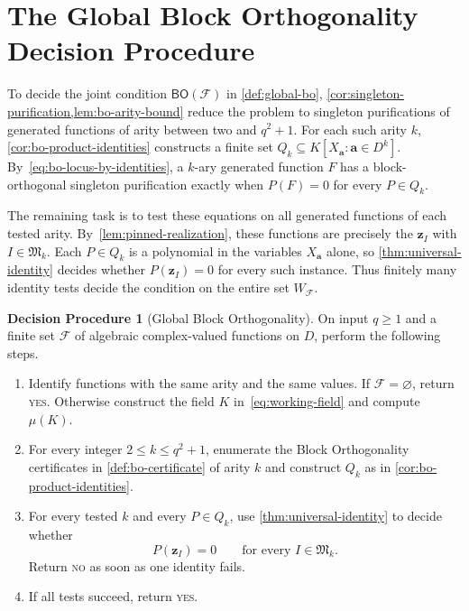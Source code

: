 \documentclass[11pt,letterpaper,onecolumn]{article}
\theoremstyle{plain}
\theoremstyle{definition}
\newtheorem{procedure}[procedure]{Decision Procedure}
\theoremstyle{remark}
\newcommand{\cF}{\mathcal F}
\newcommand{\BO}{\mathsf{BO}}
\newcommand{\zvec}[1]{\mathbf z_{#1}}
\newcommand{\InstMonoid}[1]{\mathfrak M_{#1}}
\newcommand{\YES}{\textnormal{\textsc{yes}}}
\newcommand{\NO}{\textnormal{\textsc{no}}}
\begin{document}
\section{The Global Block Orthogonality Decision Procedure}
\label{sec:bo-algorithm}

To decide the joint condition $\BO(\cF)$ in \cref{def:global-bo},
\cref{cor:singleton-purification,lem:bo-arity-bound} reduce the problem
to singleton purifications of generated functions of arity between two
and $q^2+1$.  For each such arity $k$,
\cref{cor:bo-product-identities} constructs a finite set
$Q_k\subseteq K[X_{\mathbf a}:\mathbf a\in D^k]$.
By~\eqref{eq:bo-locus-by-identities}, a $k$-ary generated function $F$
has a block-orthogonal singleton purification exactly when $P(F)=0$
for every $P\in Q_k$.

The remaining task is to test these equations on all generated functions
of each tested arity.  By~\cref{lem:pinned-realization}, these functions
are precisely the $\zvec I$ with $I\in\InstMonoid{k}$.
Each $P\in Q_k$ is a polynomial in the variables $X_{\mathbf a}$ alone,
so \cref{thm:universal-identity} decides whether $P(\zvec I)=0$ for
every such instance.  Thus finitely many identity tests decide the
condition on the entire set $W_{\cF}$.

\begin{procedure}[Global Block Orthogonality]
\label{proc:global-bo}
On input $q\ge1$ and a finite set $\cF$ of algebraic
complex-valued functions on $D$, perform the following steps.
\begin{enumerate}
  \item Identify functions with the same arity and the same values.  If $\cF=\varnothing$, return
        \YES.  Otherwise construct the field $K$
        in~\eqref{eq:working-field} and compute $\mu(K)$.
  \item For every integer $2\le k\le q^2+1$, enumerate the Block
        Orthogonality certificates in \cref{def:bo-certificate} of arity $k$ and
        construct $Q_k$ as in \cref{cor:bo-product-identities}.
  \item For every tested $k$ and every $P\in Q_k$, use
        \cref{thm:universal-identity} to decide whether
        \[
          P(\zvec I)=0
          \qquad\text{for every }I\in\InstMonoid{k}.
        \]
        Return \NO{} as soon as one identity fails.
  \item If all tests succeed, return \YES.
\end{enumerate}
\end{procedure}
\end{document}
